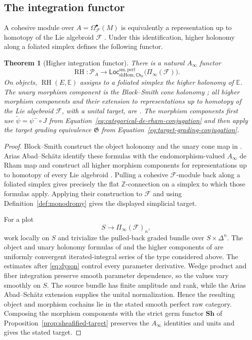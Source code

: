 \documentclass[12pt]{amsart}
\newtheorem{thm}{Theorem}[section]
\theoremstyle{definition}
\theoremstyle{remark}
\numberwithin{equation}{section}
\newcommand{\CF}{{\mathcal F}}
\newcommand{\A}{{A}}
\newcommand{\Z}{{\mathbb{Z}}}
\newcommand{\R}{{\mathbb{R}}}
\newcommand{\1}{{\mathbb{1}}}
\newcommand{\Ch}{\mathsf{Ch}}
\newcommand{\Loc}{\mathsf{Loc}}
\newcommand{\RH}{\operatorname{RH}}
\begin{document}
\subsection{The integration functor}

A cohesive module over $\A=\Omega^\bullet_{\CF}(M)$ is equivalently a
representation up to homotopy of the Lie algebroid $\CF$
\cite[Definition 3.1]{AC11}.  Under this identification, higher holonomy
along a foliated simplex defines the following functor.

\begin{thm}[Higher integration functor]
\label{thm:integration}
There is a natural $A_{\infty}$ functor
\[
 \RH:
 \mathcal P_{\A}
 \longrightarrow
 \Loc_{\mathrm{shHom},\Ch_{\R}}^{\mathrm{sm,perf}}
 \bigl(\Pi_{\infty}(\CF)\bigr).
\]
On objects, $\RH(E,\mathbb E)$ assigns to a foliated simplex the higher
holonomy of $\mathbb E$.  The unary morphism component is the
Block--Smith cone holonomy \cite[Sections 3.5 and 4.1]{BS14}; all
higher morphism components and their extension to representations up
to homotopy of the Lie algebroid $\CF$, with a unital target, are
\cite[Definition 4.16 and Theorem 4.18]{AS12}.  The morphism
components first use
$\widetilde\psi=\psi^-\circ J$ from
Equation~\eqref{eq:categorical-de-rham-conjugation} and then apply the
target grading equivalence $\mathfrak G$ from
Equation~\eqref{eq:target-grading-conjugation}.
\end{thm}

\begin{proof}
Block--Smith construct the object holonomy and the unary cone map in
\cite[Sections 3.4--4.1]{BS14}.  Arias Abad--Sch\"atz identify these
formulas with the endomorphism-valued $A_\infty$ de Rham map and
construct all higher morphism components for representations up to
homotopy of every Lie algebroid
\cite[Definition 4.16 and Theorem 4.18]{AS12}.  Pulling a cohesive
$\CF$-module back along a foliated simplex gives precisely the flat
$\Z$-connection on a simplex to which those formulas apply.  Applying
their construction to $\CF$ and using Definition~\ref{def:monodromy}
gives the displayed simplicial target.

For a plot
\[
 S\longrightarrow\Pi_\infty(\CF)_n,
\]
work locally on $S$ and trivialize the pulled-back graded bundle over
$S\times\Delta^n$.  The object and unary holonomy formulas of
\cite[Sections 3.4--4.1 and Theorem 4.2]{BS14} and the higher
components of \cite[Theorem 4.18]{AS12} are uniformly convergent
iterated-integral series of the type considered above.
The estimates after \eqref{eq:dyson} control every parameter
derivative.  Wedge product and fiber integration preserve smooth
parameter dependence, so the values vary smoothly on $S$.  The source
bundle has finite amplitude and rank, while the Arias
Abad--Sch\"atz extension supplies the unital normalization.  Hence the
resulting object and morphism cochains lie in the stated smooth perfect
raw category.  Composing the morphism components with the strict germ
functor $\mathbf{Sh}$ of Proposition~\ref{prop:sheafified-target}
preserves the $A_\infty$ identities and units and gives the stated
target.
\end{proof}
\end{document}
